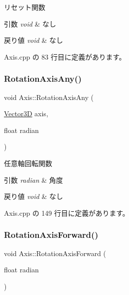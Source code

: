 リセット関数 


\begin{DoxyParams}{引数}
{\em void} & なし \\
\hline
\end{DoxyParams}

\begin{DoxyRetVals}{戻り値}
{\em void} & なし \\
\hline
\end{DoxyRetVals}


 Axis.\+cpp の 83 行目に定義があります。

\mbox{\label{class_axis_a02f95ead5d71cf4f4a38b6a9f9d19caa}} 
\subsubsection{\texorpdfstring{Rotation\+Axis\+Any()}{RotationAxisAny()}}
{\footnotesize\ttfamily void Axis\+::\+Rotation\+Axis\+Any (\begin{DoxyParamCaption}\item[{\mbox{\hyperlink{class_vector3_d}{Vector3D}}}]{axis,  }\item[{float}]{radian }\end{DoxyParamCaption})}



任意軸回転関数 


\begin{DoxyParams}{引数}
{\em radian} & 角度 \\
\hline
\end{DoxyParams}

\begin{DoxyRetVals}{戻り値}
{\em void} & なし \\
\hline
\end{DoxyRetVals}


 Axis.\+cpp の 149 行目に定義があります。

\mbox{\label{class_axis_af53def73117a3e373768d6c155af3103}} 
\subsubsection{\texorpdfstring{Rotation\+Axis\+Forward()}{RotationAxisForward()}}
{\footnotesize\ttfamily void Axis\+::\+Rotation\+Axis\+Forward (\begin{DoxyParamCaption}\item[{float}]{radian }\end{DoxyParamCaption})}



